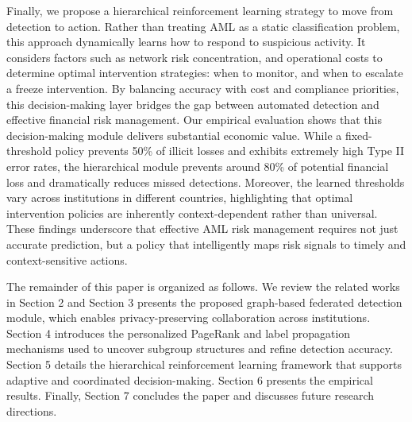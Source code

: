
Finally, we propose a hierarchical reinforcement learning strategy to move from detection to action. Rather than treating AML as a static classification problem, this approach dynamically learns how to respond to suspicious activity. It considers factors such as network risk concentration, and operational costs to determine optimal intervention strategies: when to monitor, and when to escalate a freeze intervention. By balancing accuracy with cost and compliance priorities, this decision-making layer bridges the gap between automated detection and effective financial risk management. Our empirical evaluation shows that this decision-making module delivers substantial economic value. While a fixed-threshold policy prevents 50\% of illicit losses and exhibits extremely high Type II error rates, the hierarchical module prevents around 80\% of potential financial loss and dramatically reduces missed detections. Moreover, the learned thresholds vary across institutions in different countries, highlighting that optimal intervention policies are inherently context-dependent rather than universal. These findings underscore that effective AML risk management requires not just accurate prediction, but a policy that intelligently maps risk signals to timely and context-sensitive actions.

The remainder of this paper is organized as follows. We review the related works in Section 2 and Section 3 presents the proposed graph-based federated detection module, which enables privacy-preserving collaboration across institutions. Section 4 introduces the personalized PageRank and label propagation mechanisms used to uncover subgroup structures and refine detection accuracy. Section 5 details the hierarchical reinforcement learning framework that supports adaptive and coordinated decision-making. Section 6 presents the empirical results. Finally, Section 7 concludes the paper and discusses future research directions.